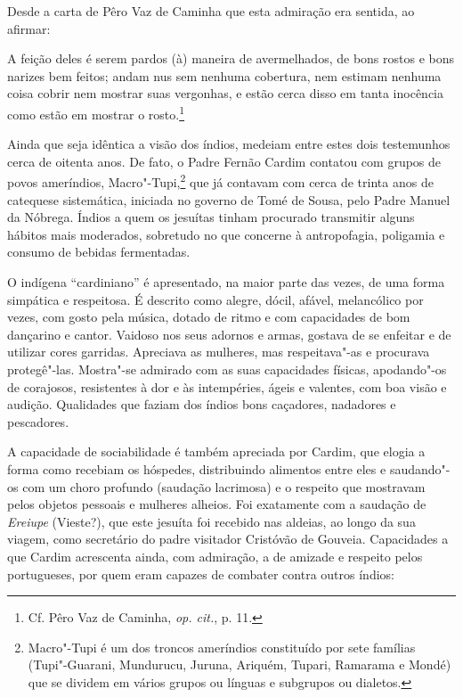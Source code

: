  Desde a carta de Pêro Vaz de Caminha que esta
admiração era sentida, ao afirmar:

\begin{hedraquote}
A feição deles é serem
pardos (à) maneira de avermelhados, de bons rostos e bons narizes
bem feitos; andam nus sem nenhuma cobertura, nem estimam nenhuma coisa 
cobrir nem mostrar suas vergonhas, e estão cerca disso em tanta inocência 
como estão em mostrar o rosto.\footnote{ Cf. Pêro Vaz de Caminha, \textit{op. cit.}, p. 11.} 
\end{hedraquote}

 Ainda que seja idêntica a visão dos índios, medeiam entre estes dois
testemunhos cerca de oitenta anos. De fato, o Padre Fernão Cardim
contatou com grupos de povos ameríndios, Macro"-Tupi,\footnote{ Macro"-Tupi é 
um dos troncos ameríndios constituído por sete famílias
(Tupi"-Guarani, Mundurucu, Juruna, Ariquém, Tupari, Ramarama e Mondé)
que se dividem em vários grupos ou línguas e subgrupos ou
dialetos.} que já contavam com cerca de trinta anos de
catequese sistemática, iniciada no governo de Tomé de Sousa, pelo Padre
Manuel da Nóbrega. Índios a quem os jesuítas tinham procurado
transmitir alguns hábitos mais moderados, sobretudo no que concerne à
antropofagia, poligamia e consumo de bebidas fermentadas. 

O indígena ``cardiniano'' é apresentado, na maior parte das vezes, de
uma forma simpática e respeitosa. É descrito como alegre, dócil,
afável, melancólico por vezes, com gosto pela música, dotado de ritmo
e com capacidades de bom dançarino e cantor. Vaidoso nos seus adornos e
armas, gostava de se enfeitar e de utilizar cores garridas. Apreciava
as mulheres, mas respeitava"-as e procurava protegê"-las. Mostra"-se
admirado com as suas capacidades físicas, apodando"-os de corajosos,
resistentes à dor e às intempéries, ágeis e valentes, com boa visão e
audição. Qualidades que faziam dos índios bons caçadores, nadadores e pescadores.

A capacidade de sociabilidade é também apreciada por Cardim, que
elogia a forma como recebiam os hóspedes, distribuindo alimentos entre
eles e saudando"-os com um choro profundo (saudação lacrimosa) e o
respeito que mostravam pelos objetos pessoais e mulheres alheios. Foi
exatamente com a saudação de \textit{Ereiupe} (Vieste?), que este
jesuíta foi recebido nas aldeias, ao longo da sua viagem, como
secretário do padre visitador Cristóvão de Gouveia. Capacidades a que
Cardim acrescenta ainda, com admiração, a de amizade e respeito pelos
portugueses, por quem eram capazes de combater contra outros índios:

